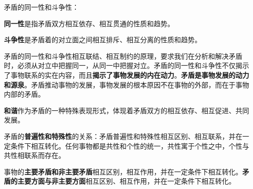 矛盾的同一性和斗争性：

\textbf{{同一性}}是指矛盾双方相互依存、相互贯通的性质和趋势。

\textbf{{斗争性}}是矛盾着的对立面之间相互排斥、相互分离的性质和趋势。

矛盾的同一性和斗争性相互联结、相互制约的原理，要求我们{在分析和解决矛盾时，必须从对立中把握同一，从同一中把握对立。}矛盾的同一性和斗争性不仅揭示了事物联系的实在内容，而且\textbf{{揭示了事物发展的内在动力}}。\textbf{{矛盾是事物发展的动力和源泉}}。矛盾推动事物的发展，事物发展的根本原因不在事物的外部，而在于事物内部的矛盾。

\textbf{{和谐}}作为矛盾的一种特殊表现形式，体现着矛盾双方的相互依存、相互促进、共同发展。

矛盾的\textbf{{普遍性和特殊性}}的关系：矛盾普遍性和特殊性相互区别、相互联系，并在一定条件下相互转化。任何事物都是共性和个性的统一，共性寓于个性之中，个性与共性相联系而存在。

{事物的}\textbf{{主要矛盾和非主要矛盾}}{相互区别，相互作用，并在一定条件下相互转化。}\textbf{{矛盾的主要方面与非主要方面}}{相互区别、相互作用，并在一定条件下相互转化。}
